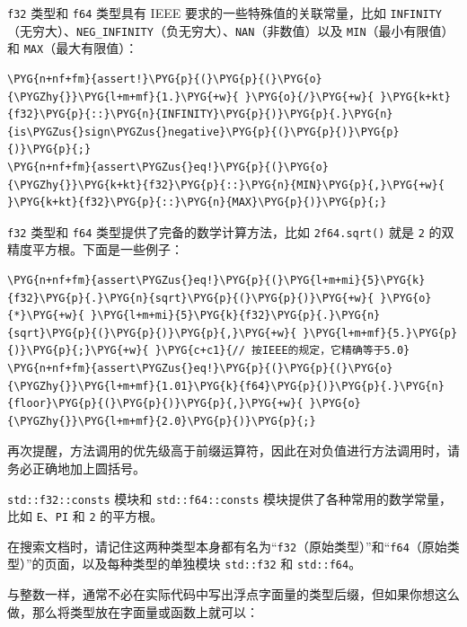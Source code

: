 \texttt{f32} 类型和 \texttt{f64} 类型具有 IEEE 要求的一些特殊值的关联常量，比如 \texttt{INFINITY}（无穷大）、\texttt{NEG\_INFINITY}（负无穷大）、\texttt{NAN}（非数值）以及 \texttt{MIN}（最小有限值）和 \texttt{MAX}（最大有限值）：

\begin{Verbatim}[commandchars=\\\{\},breaklines=true,breakanywhere=true,fontsize=\codefont,xleftmargin=17bp]
\PYG{n+nf+fm}{assert!}\PYG{p}{(}\PYG{p}{(}\PYG{o}{\PYGZhy{}}\PYG{l+m+mf}{1.}\PYG{+w}{ }\PYG{o}{/}\PYG{+w}{ }\PYG{k+kt}{f32}\PYG{p}{::}\PYG{n}{INFINITY}\PYG{p}{)}\PYG{p}{.}\PYG{n}{is\PYGZus{}sign\PYGZus{}negative}\PYG{p}{(}\PYG{p}{)}\PYG{p}{)}\PYG{p}{;}
\PYG{n+nf+fm}{assert\PYGZus{}eq!}\PYG{p}{(}\PYG{o}{\PYGZhy{}}\PYG{k+kt}{f32}\PYG{p}{::}\PYG{n}{MIN}\PYG{p}{,}\PYG{+w}{ }\PYG{k+kt}{f32}\PYG{p}{::}\PYG{n}{MAX}\PYG{p}{)}\PYG{p}{;}
\end{Verbatim}

\texttt{f32} 类型和 \texttt{f64} 类型提供了完备的数学计算方法，比如 \texttt{2f64.sqrt()} 就是 \texttt{2} 的双精度平方根。下面是一些例子：

\begin{Verbatim}[commandchars=\\\{\},breaklines=true,breakanywhere=true,fontsize=\codefont,xleftmargin=17bp]
\PYG{n+nf+fm}{assert\PYGZus{}eq!}\PYG{p}{(}\PYG{l+m+mi}{5}\PYG{k}{f32}\PYG{p}{.}\PYG{n}{sqrt}\PYG{p}{(}\PYG{p}{)}\PYG{+w}{ }\PYG{o}{*}\PYG{+w}{ }\PYG{l+m+mi}{5}\PYG{k}{f32}\PYG{p}{.}\PYG{n}{sqrt}\PYG{p}{(}\PYG{p}{)}\PYG{p}{,}\PYG{+w}{ }\PYG{l+m+mf}{5.}\PYG{p}{)}\PYG{p}{;}\PYG{+w}{ }\PYG{c+c1}{// 按IEEE的规定，它精确等于5.0}
\PYG{n+nf+fm}{assert\PYGZus{}eq!}\PYG{p}{(}\PYG{p}{(}\PYG{o}{\PYGZhy{}}\PYG{l+m+mf}{1.01}\PYG{k}{f64}\PYG{p}{)}\PYG{p}{.}\PYG{n}{floor}\PYG{p}{(}\PYG{p}{)}\PYG{p}{,}\PYG{+w}{ }\PYG{o}{\PYGZhy{}}\PYG{l+m+mf}{2.0}\PYG{p}{)}\PYG{p}{;}
\end{Verbatim}

再次提醒，方法调用的优先级高于前缀运算符，因此在对负值进行方法调用时，请务必正确地加上圆括号。

\texttt{std::f32::consts} 模块和 \texttt{std::f64::consts} 模块提供了各种常用的数学常量，比如 \texttt{E}、\texttt{PI} 和 \texttt{2} 的平方根。

在搜索文档时，请记住这两种类型本身都有名为“\texttt{f32}（原始类型）”和“\texttt{f64}（原始类型）”的页面，以及每种类型的单独模块 \texttt{std::f32} 和 \texttt{std::f64}。

与整数一样，通常不必在实际代码中写出浮点字面量的类型后缀，但如果你想这么做，那么将类型放在字面量或函数上就可以：

